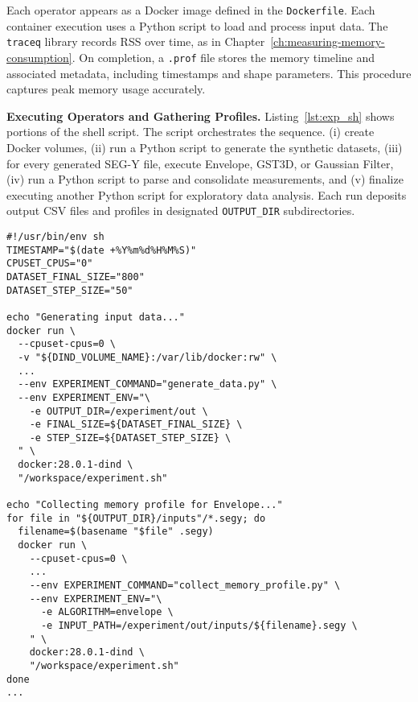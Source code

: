 Each operator appears as a Docker image defined in the \texttt{Dockerfile}.
Each container execution uses a Python script to load and process input data.
The \texttt{traceq} library records \ac{RSS} over time, as  in Chapter~\ref{ch:measuring-memory-consumption}.
On completion, a \texttt{.prof} file stores the memory timeline and associated metadata, including timestamps and shape parameters.
This procedure captures peak memory usage accurately.

\vspace{1em}
\noindent
\textbf{Executing Operators and Gathering Profiles.}
Listing~\ref{lst:exp_sh} shows portions of the shell script.
The script orchestrates the sequence.
(i) create Docker volumes,
(ii) run a Python script to generate the synthetic datasets,
(iii) for every generated \ac{SEG-Y} file, execute Envelope, \ac{GST3D}, or Gaussian Filter,
(iv) run a Python script to parse and consolidate measurements,
and (v) finalize executing another Python script for exploratory data analysis.
Each run deposits output \ac{CSV} files and profiles in designated \texttt{OUTPUT\_DIR} subdirectories.

\vspace{1em}
\begin{lstlisting}[style=bashstyle,caption={Excerpts from \texttt{experiment.sh}~\cite{delucca2025experiment2script} that orchestrate Docker-based runs. Variables like \texttt{DATASET\_FINAL\_SIZE} and \texttt{DATASET\_STEP\_SIZE} define shape ranges for dataset generation.}, label={lst:exp_sh}]
#!/usr/bin/env sh
TIMESTAMP="$(date +%Y%m%d%H%M%S)"
CPUSET_CPUS="0"
DATASET_FINAL_SIZE="800"
DATASET_STEP_SIZE="50"

echo "Generating input data..."
docker run \
  --cpuset-cpus=0 \
  -v "${DIND_VOLUME_NAME}:/var/lib/docker:rw" \
  ...
  --env EXPERIMENT_COMMAND="generate_data.py" \
  --env EXPERIMENT_ENV="\
    -e OUTPUT_DIR=/experiment/out \
    -e FINAL_SIZE=${DATASET_FINAL_SIZE} \
    -e STEP_SIZE=${DATASET_STEP_SIZE} \
  " \
  docker:28.0.1-dind \
  "/workspace/experiment.sh"

echo "Collecting memory profile for Envelope..."
for file in "${OUTPUT_DIR}/inputs"/*.segy; do
  filename=$(basename "$file" .segy)
  docker run \
    --cpuset-cpus=0 \
    ...
    --env EXPERIMENT_COMMAND="collect_memory_profile.py" \
    --env EXPERIMENT_ENV="\
      -e ALGORITHM=envelope \
      -e INPUT_PATH=/experiment/out/inputs/${filename}.segy \
    " \
    docker:28.0.1-dind \
    "/workspace/experiment.sh"
done
...
\end{lstlisting}

